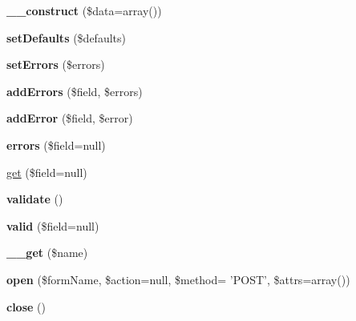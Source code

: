 \begin{DoxyCompactItemize}
\item 
\hypertarget{classForm_a918137d720fb6740e8d91b5355023e3e}{
{\bfseries \_\-\_\-construct} (\$data=array())}
\label{classForm_a918137d720fb6740e8d91b5355023e3e}

\item 
\hypertarget{classForm_a0d2f1545bc27ebcaaab84baca3b2ec3d}{
{\bfseries setDefaults} (\$defaults)}
\label{classForm_a0d2f1545bc27ebcaaab84baca3b2ec3d}

\item 
\hypertarget{classForm_a4146c9fec58751931eeeafb6a5032109}{
{\bfseries setErrors} (\$errors)}
\label{classForm_a4146c9fec58751931eeeafb6a5032109}

\item 
\hypertarget{classForm_ad628bf69f4aacf56874e228f4dffe278}{
{\bfseries addErrors} (\$field, \$errors)}
\label{classForm_ad628bf69f4aacf56874e228f4dffe278}

\item 
\hypertarget{classForm_a76a626645b5dd91fea35238c40b73057}{
{\bfseries addError} (\$field, \$error)}
\label{classForm_a76a626645b5dd91fea35238c40b73057}

\item 
\hypertarget{classForm_a1cd7191ba1fab1817ea6bffab804f82d}{
{\bfseries errors} (\$field=null)}
\label{classForm_a1cd7191ba1fab1817ea6bffab804f82d}

\item 
\hyperlink{classForm_a30692b7cf24078d8ce209b98fd27aa80}{get} (\$field=null)
\item 
\hypertarget{classForm_a89ce95b4a8eacc465730fb5e240ff66d}{
{\bfseries validate} ()}
\label{classForm_a89ce95b4a8eacc465730fb5e240ff66d}

\item 
\hypertarget{classForm_a719fa0e86b18283faee39d7e0d69957d}{
{\bfseries valid} (\$field=null)}
\label{classForm_a719fa0e86b18283faee39d7e0d69957d}

\item 
\hypertarget{classForm_a29e82a4cae1e8a22abad773b8c2b2b02}{
{\bfseries \_\-\_\-get} (\$name)}
\label{classForm_a29e82a4cae1e8a22abad773b8c2b2b02}

\item 
\hypertarget{classForm_a1e913aa59b9ea8d8007c47f989558943}{
{\bfseries open} (\$formName, \$action=null, \$method= 'POST', \$attrs=array())}
\label{classForm_a1e913aa59b9ea8d8007c47f989558943}

\item 
\hypertarget{classForm_aaa8d1ff2d98b23893bfa66ae8766212a}{
{\bfseries close} ()}
\label{classForm_aaa8d1ff2d98b23893bfa66ae8766212a}


\end{DoxyCompactItemize}
